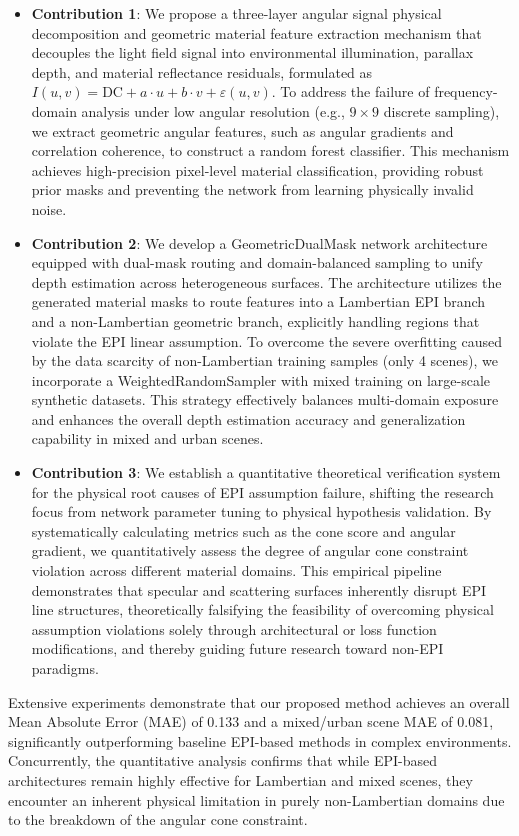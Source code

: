 \begin{itemize}
 \item \textbf{Contribution 1}: We propose a three-layer angular signal physical decomposition and geometric material feature extraction mechanism that decouples the light field signal into environmental illumination, parallax depth, and material reflectance residuals, formulated as $I(u,v) = \text{DC} + a \cdot u + b \cdot v + \varepsilon(u,v)$. To address the failure of frequency-domain analysis under low angular resolution (e.g., $9 \times 9$ discrete sampling), we extract geometric angular features, such as angular gradients and correlation coherence, to construct a random forest classifier. This mechanism achieves high-precision pixel-level material classification, providing robust prior masks and preventing the network from learning physically invalid noise.
 \item \textbf{Contribution 2}: We develop a GeometricDualMask network architecture equipped with dual-mask routing and domain-balanced sampling to unify depth estimation across heterogeneous surfaces. The architecture utilizes the generated material masks to route features into a Lambertian EPI branch and a non-Lambertian geometric branch, explicitly handling regions that violate the EPI linear assumption. To overcome the severe overfitting caused by the data scarcity of non-Lambertian training samples (only 4 scenes), we incorporate a WeightedRandomSampler with mixed training on large-scale synthetic datasets. This strategy effectively balances multi-domain exposure and enhances the overall depth estimation accuracy and generalization capability in mixed and urban scenes.
 \item \textbf{Contribution 3}: We establish a quantitative theoretical verification system for the physical root causes of EPI assumption failure, shifting the research focus from network parameter tuning to physical hypothesis validation. By systematically calculating metrics such as the cone score and angular gradient, we quantitatively assess the degree of angular cone constraint violation across different material domains. This empirical pipeline demonstrates that specular and scattering surfaces inherently disrupt EPI line structures, theoretically falsifying the feasibility of overcoming physical assumption violations solely through architectural or loss function modifications, and thereby guiding future research toward non-EPI paradigms.
\end{itemize}
Extensive experiments demonstrate that our proposed method achieves an overall Mean Absolute Error (MAE) of 0.133 and a mixed/urban scene MAE of 0.081, significantly outperforming baseline EPI-based methods in complex environments. Concurrently, the quantitative analysis confirms that while EPI-based architectures remain highly effective for Lambertian and mixed scenes, they encounter an inherent physical limitation in purely non-Lambertian domains due to the breakdown of the angular cone constraint.